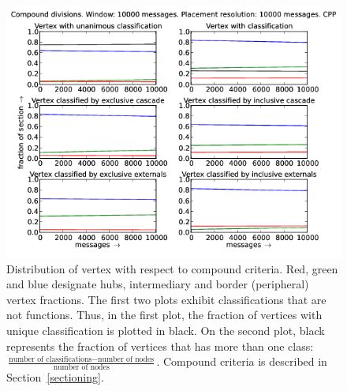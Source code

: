 \documentclass[%
 aip,
 jmp,%
 amsmath,amssymb,
 reprint,%
]{revtex4-1}
\begin{document}
\begin{figure}[hbtp] 
   \centering
        \includegraphics[width=\textwidth]{figs/CPP/10000_2}
    \caption{Distribution of vertex with respect to compound criteria. Red, green and blue designate hubs, intermediary and border (peripheral) vertex fractions. The first two plots exhibit classifications that are not functions. Thus, in the first plot, the fraction of vertices with unique classification is plotted in black. On the second plot, black represents the fraction of vertices that has more than one class: $\frac{\text{number of classifications} - \text{number of nodes}}{\text{number of nodes}}$. Compound criteria is described in Section~\ref{sectioning}.}
    \label{fig:cpp10000_}
\end{figure}
\end{document}
